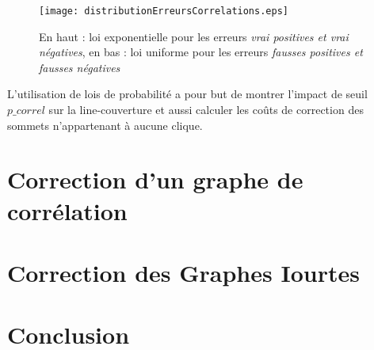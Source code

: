 \documentclass[onecolumn, 12pt]{book}
\begin{document}
\begin{figure}[htb!] 
\centering
\texttt{[image: distributionErreursCorrelations.eps]}
\caption{En haut : loi exponentielle pour les erreurs   {\em vrai positives et vrai n\'egatives}, en bas : loi uniforme pour les erreurs   {\em fausses positives et fausses n\'egatives} }
\label{distributionErreursCorrelations} 
\end{figure}

 
L'utilisation de lois de probabilit\'e a pour but de montrer l'impact de seuil $p\_correl$ sur la line-couverture et aussi calculer les co\^uts de correction des sommets n'appartenant \`a aucune clique.

\section{Correction d'un graphe de corr\'elation}


\section{Correction des Graphes Iourtes}


\section{Conclusion}
\end{document}
